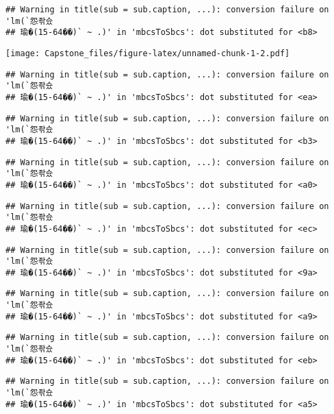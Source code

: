 \documentclass[]{article}
\begin{document}
\begin{verbatim}
## Warning in title(sub = sub.caption, ...): conversion failure on 'lm(`怨좎슜
## 瑜�(15-64��)` ~ .)' in 'mbcsToSbcs': dot substituted for <b8>
\end{verbatim}

\texttt{[image: Capstone\_files/figure-latex/unnamed-chunk-1-2.pdf]}

\begin{verbatim}
## Warning in title(sub = sub.caption, ...): conversion failure on 'lm(`怨좎슜
## 瑜�(15-64��)` ~ .)' in 'mbcsToSbcs': dot substituted for <ea>
\end{verbatim}

\begin{verbatim}
## Warning in title(sub = sub.caption, ...): conversion failure on 'lm(`怨좎슜
## 瑜�(15-64��)` ~ .)' in 'mbcsToSbcs': dot substituted for <b3>
\end{verbatim}

\begin{verbatim}
## Warning in title(sub = sub.caption, ...): conversion failure on 'lm(`怨좎슜
## 瑜�(15-64��)` ~ .)' in 'mbcsToSbcs': dot substituted for <a0>
\end{verbatim}

\begin{verbatim}
## Warning in title(sub = sub.caption, ...): conversion failure on 'lm(`怨좎슜
## 瑜�(15-64��)` ~ .)' in 'mbcsToSbcs': dot substituted for <ec>
\end{verbatim}

\begin{verbatim}
## Warning in title(sub = sub.caption, ...): conversion failure on 'lm(`怨좎슜
## 瑜�(15-64��)` ~ .)' in 'mbcsToSbcs': dot substituted for <9a>
\end{verbatim}

\begin{verbatim}
## Warning in title(sub = sub.caption, ...): conversion failure on 'lm(`怨좎슜
## 瑜�(15-64��)` ~ .)' in 'mbcsToSbcs': dot substituted for <a9>
\end{verbatim}

\begin{verbatim}
## Warning in title(sub = sub.caption, ...): conversion failure on 'lm(`怨좎슜
## 瑜�(15-64��)` ~ .)' in 'mbcsToSbcs': dot substituted for <eb>
\end{verbatim}

\begin{verbatim}
## Warning in title(sub = sub.caption, ...): conversion failure on 'lm(`怨좎슜
## 瑜�(15-64��)` ~ .)' in 'mbcsToSbcs': dot substituted for <a5>
\end{verbatim}
\end{document}
